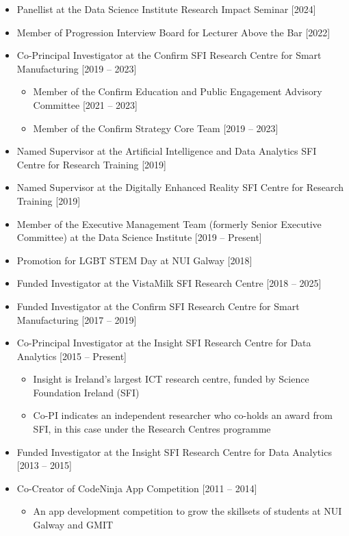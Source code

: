 \documentclass[10pt,a4paper]{res} %
\begin{document}
\begin{resume}
\begin{itemize} \itemsep -2pt
\item Panellist at the Data Science Institute Research Impact Seminar [2024]
\item Member of Progression Interview Board for Lecturer Above the Bar [2022]
\item Co-Principal Investigator at the Confirm SFI Research Centre for Smart Manufacturing [2019 -- 2023]
\begin{itemize} \itemsep -2pt
\item Member of the Confirm Education and Public Engagement Advisory Committee [2021 -- 2023]
\item Member of the Confirm Strategy Core Team [2019 -- 2023]
\end{itemize}
\item Named Supervisor at the Artificial Intelligence and Data Analytics SFI Centre for Research Training [2019]
\item Named Supervisor at the Digitally Enhanced Reality SFI Centre for Research Training [2019]
\item Member of the Executive Management Team (formerly Senior Executive Committee) at the Data Science Institute [2019 -- Present]
\item Promotion for LGBT STEM Day at NUI Galway [2018]
\item Funded Investigator at the VistaMilk SFI Research Centre [2018 -- 2025]
\item Funded Investigator at the Confirm SFI Research Centre for Smart Manufacturing [2017 -- 2019]
\item Co-Principal Investigator at the Insight SFI Research Centre for Data Analytics [2015 -- Present]
\begin{itemize} \itemsep -2pt
\item Insight is Ireland's largest ICT research centre, funded by Science Foundation Ireland (SFI)
\item Co-PI indicates an independent researcher who co-holds an award from SFI, in this case under the Research Centres programme
\end{itemize}
\item Funded Investigator at the Insight SFI Research Centre for Data Analytics [2013 -- 2015]
\item Co-Creator of CodeNinja App Competition [2011 -- 2014]
\begin{itemize} \itemsep -2pt
\item An app development competition to grow the skillsets of students at NUI Galway and GMIT

\end{itemize}
\end{itemize}
\end{resume}
\end{document}
